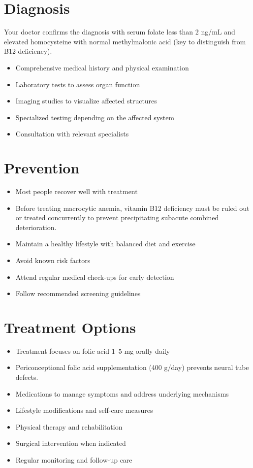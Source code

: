 \section{Diagnosis}
Your doctor confirms the diagnosis with serum folate less than 2 ng/mL and elevated homocysteine with normal methylmalonic acid (key to distinguish from B12 deficiency).

\begin{itemize}[noitemsep]
  \item Comprehensive medical history and physical examination
  \item Laboratory tests to assess organ function
  \item Imaging studies to visualize affected structures
  \item Specialized testing depending on the affected system
  \item Consultation with relevant specialists
\end{itemize}
\section{Prevention}
\begin{itemize}[noitemsep]
  \item Most people recover well with treatment
  \item Before treating macrocytic anemia, vitamin B12 deficiency must be ruled out or treated concurrently to prevent precipitating subacute combined deterioration.
  \item Maintain a healthy lifestyle with balanced diet and exercise
  \item Avoid known risk factors
  \item Attend regular medical check-ups for early detection
  \item Follow recommended screening guidelines
\end{itemize}
\section{Treatment Options}
\begin{itemize}[noitemsep]
  \item Treatment focuses on folic acid 1--5 mg orally daily
  \item Periconceptional folic acid supplementation (400 \textmu g/day) prevents neural tube defects.
  \item Medications to manage symptoms and address underlying mechanisms
  \item Lifestyle modifications and self-care measures
  \item Physical therapy and rehabilitation
  \item Surgical intervention when indicated
  \item Regular monitoring and follow-up care
\end{itemize}
